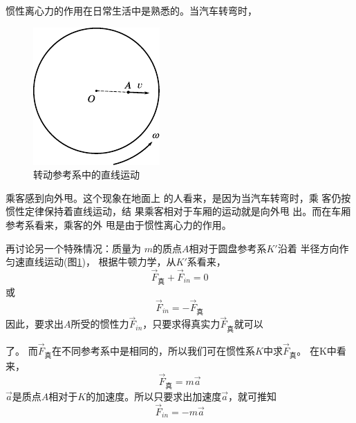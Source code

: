 惯性离心力的作用在日常生活中是熟悉的。当汽车转弯时，
\begin{figure}
    \centering
    \includegraphics{figure/fig12.04}
    \caption{转动参考系中的直线运动}
    \label{fig:12.04}
\end{figure}
乘客感到向外甩。这个现象在地面上
的人看来，是因为当汽车转弯时，乘
客仍按惯性定律保持着直线运动，结
果乘客相对于车厢的运动就是向外甩
出。而在车厢参考系看来，乘客的外
甩是由于惯性离心力的作用。

再讨论另一个特殊情况：质量为
$ m $的质点$ A $相对于圆盘参考系$ K' $沿着
半径方向作匀速直线运动(图\ref{fig:12.04})，
根据牛顿力学，从$ K' $系看来，
\begin{equation*}
    \vec{F} _ \text{真} + \vec{F} _ {in} = 0
\end{equation*}
或\vspace{-1.8em}
\begin{equation*}
    \vec{F} _ {in} = - \vec{F} _ \text{真}
\end{equation*}
因此，要求出$ A $所受的惯性力$ \vec{F} _ {in} $，只要求得真实力$ \vec{F} _ \text{真} $就可以

\noindent 了。
而$ \vec{F} _ \text{真} $在不同参考系中是相同的，所以我们可在惯性系$ K $中求$ \vec{F} _ \text{真} $。
在K中看来，
\begin{equation*}
    \vec{F} _ \text{真} = m \vec{a}
\end{equation*}
$\vec{a}$是质点$ A $相对于$ K $的加速度。所以只要求出加速度$\vec{a}$，就可推知\vspace{-1.8em}
\begin{equation*}
    \vec{F} _ {in} = - m \vec{a}
\end{equation*}

